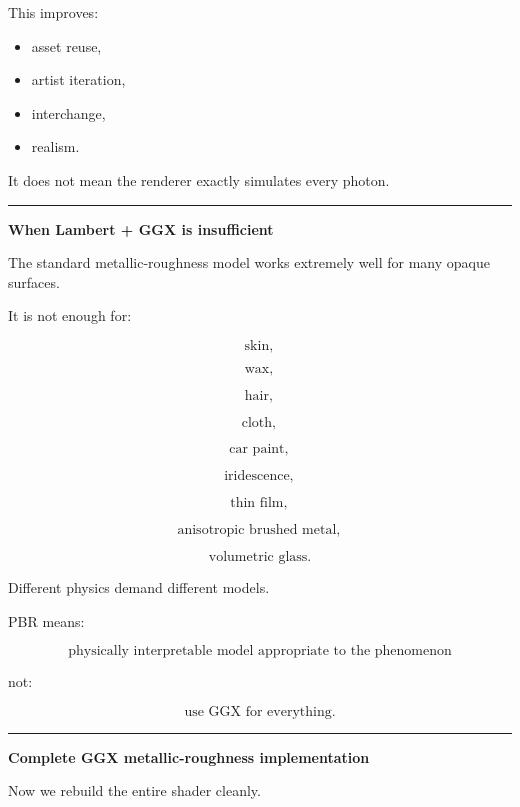 This improves:

\begin{itemize}
\tightlist
\item
  asset reuse,
\item
  artist iteration,
\item
  interchange,
\item
  realism.
\end{itemize}

It does not mean the renderer exactly simulates every photon.

\begin{center}\rule{0.5\linewidth}{0.5pt}\end{center}

\textbf{When Lambert + GGX is insufficient}

The standard metallic-roughness model works extremely well for many opaque surfaces.

It is not enough for:

\[
\text{skin},
\]

\[
\text{wax},
\]

\[
\text{hair},
\]

\[
\text{cloth},
\]

\[
\text{car paint},
\]

\[
\text{iridescence},
\]

\[
\text{thin film},
\]

\[
\text{anisotropic brushed metal},
\]

\[
\text{volumetric glass}.
\]

Different physics demand different models.

PBR means:

\[
\boxed{
\text{physically interpretable model appropriate to the phenomenon}
}
\]

not:

\[
\boxed{
\text{use GGX for everything}.
}
\]

\begin{center}\rule{0.5\linewidth}{0.5pt}\end{center}

\textbf{Complete GGX metallic-roughness implementation}

Now we rebuild the entire shader cleanly.

